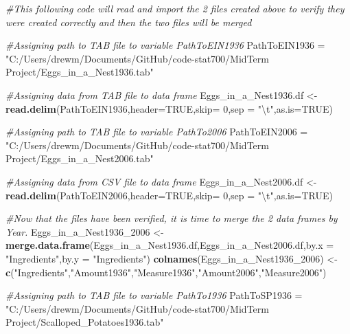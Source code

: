 \documentclass[]{article}
\newenvironment{Shaded}{\begin{snugshade}}{\end{snugshade}}
\newcommand{\KeywordTok}[1]{\textcolor[rgb]{0.13,0.29,0.53}{\textbf{#1}}}
\newcommand{\DataTypeTok}[1]{\textcolor[rgb]{0.13,0.29,0.53}{#1}}
\newcommand{\DecValTok}[1]{\textcolor[rgb]{0.00,0.00,0.81}{#1}}
\newcommand{\CharTok}[1]{\textcolor[rgb]{0.31,0.60,0.02}{#1}}
\newcommand{\StringTok}[1]{\textcolor[rgb]{0.31,0.60,0.02}{#1}}
\newcommand{\CommentTok}[1]{\textcolor[rgb]{0.56,0.35,0.01}{\textit{#1}}}
\newcommand{\OtherTok}[1]{\textcolor[rgb]{0.56,0.35,0.01}{#1}}
\newcommand{\NormalTok}[1]{#1}
\begin{document}
\begin{Shaded}
\begin{Highlighting}[]
\CommentTok{#This following code will read and import the 2 files created above to verify they were created correctly and then the two files will be merged}

\CommentTok{#Assigning path to TAB file to variable PathToEIN1936}
\NormalTok{PathToEIN1936 =}\StringTok{ "C:/Users/drewm/Documents/GitHub/code-stat700/MidTerm Project/Eggs_in_a_Nest1936.tab"}

\CommentTok{#Assigning data from TAB file to data frame}
\NormalTok{Eggs_in_a_Nest1936.df <-}\StringTok{ }\KeywordTok{read.delim}\NormalTok{(PathToEIN1936,}\DataTypeTok{header=}\OtherTok{TRUE}\NormalTok{,}\DataTypeTok{skip=} \DecValTok{0}\NormalTok{,}\DataTypeTok{sep =} \StringTok{"}\CharTok{\textbackslash{}t}\StringTok{"}\NormalTok{,}\DataTypeTok{as.is=}\OtherTok{TRUE}\NormalTok{)}

\CommentTok{#Assigning path to TAB file to variable PathTo2006}
\NormalTok{PathToEIN2006 =}\StringTok{ "C:/Users/drewm/Documents/GitHub/code-stat700/MidTerm Project/Eggs_in_a_Nest2006.tab"}

\CommentTok{#Assigning data from CSV file to data frame}
\NormalTok{Eggs_in_a_Nest2006.df <-}\StringTok{ }\KeywordTok{read.delim}\NormalTok{(PathToEIN2006,}\DataTypeTok{header=}\OtherTok{TRUE}\NormalTok{,}\DataTypeTok{skip=} \DecValTok{0}\NormalTok{,}\DataTypeTok{sep =} \StringTok{"}\CharTok{\textbackslash{}t}\StringTok{"}\NormalTok{,}\DataTypeTok{as.is=}\OtherTok{TRUE}\NormalTok{)}

\CommentTok{#Now that the files have been verified, it is time to merge the 2 data frames by Year.}
\NormalTok{Eggs_in_a_Nest1936_}\DecValTok{2006}\NormalTok{ <-}\StringTok{ }\KeywordTok{merge.data.frame}\NormalTok{(Eggs_in_a_Nest1936.df,Eggs_in_a_Nest2006.df,}\DataTypeTok{by.x =} \StringTok{"Ingredients"}\NormalTok{,}\DataTypeTok{by.y =} \StringTok{"Ingredients"}\NormalTok{)}
\KeywordTok{colnames}\NormalTok{(Eggs_in_a_Nest1936_}\DecValTok{2006}\NormalTok{) <-}\StringTok{ }\KeywordTok{c}\NormalTok{(}\StringTok{"Ingredients"}\NormalTok{,}\StringTok{"Amount1936"}\NormalTok{,}\StringTok{"Measure1936"}\NormalTok{,}\StringTok{"Amount2006"}\NormalTok{,}\StringTok{"Measure2006"}\NormalTok{)}

\CommentTok{#Assigning path to TAB file to variable PathTo1936}
\NormalTok{PathToSP1936 =}\StringTok{ "C:/Users/drewm/Documents/GitHub/code-stat700/MidTerm Project/Scalloped_Potatoes1936.tab"}


\end{Highlighting}
\end{Shaded}
\end{document}
